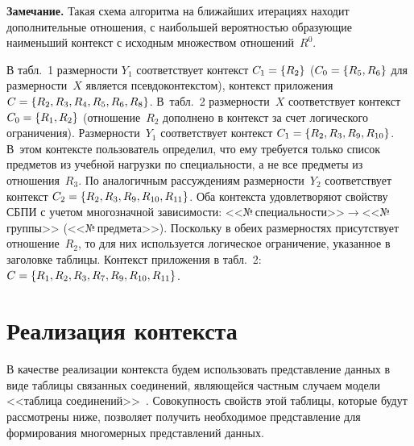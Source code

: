 \begin{multicols}{2}
  \noindent
  \textbf{Замечание.} Такая схема алгоритма на ближайших итерациях находит 
дополнительные отношения, с наибольшей вероятностью образующие 
наименьший контекст с исходным множеством отношений~$R^0$.
  
  \smallskip
  
  В табл.~1 размерности $Y_1$ соответствует контекст $C_1\hm=\{R_2\}$ 
($C_0\hm=\{R_5, R_6\}$ для размерности~$X$ является псевдоконтекстом), 
контекст приложения $C\hm=\{R_2, R_3, R_4, R_5, R_6, R_8\}$. В~табл.~2 
раз\-мер\-ности~$X$ соответствует контекст $C_0\hm=\{R_1, R_2\}$ 
(отношение~$R_2$ дополнено в контекст за счет логического ограничения). 
Размерности~$Y_1$ соответствует контекст $C_1\hm=\{R_2, R_3, R_9, R_{10}\}$. 
В~этом контексте пользователь определил, что ему требуется только список 
предметов из учебной нагрузки по специальности, а не все предметы из 
отношения~$R_3$. По аналогичным рассуждениям размерности~$Y_2$ 
соответствует контекст $C_2\hm=\{R_2, R_3, R_9, R_{10}, R_{11}\}$. Оба контекста 
удовлетворяют свойству СБПИ с учетом многозначной зависимости: 
<<№\,спе\-ци\-аль\-ности>>\;$\to$\;<<№\,груп\-пы>> (<<№\,предмета>>). 
Поскольку в обеих размерностях присутствует отношение~$R_2$, то для них 
используется логическое ограничение, указанное в заголовке таблицы. 
Контекст приложения в табл.~2: $C\hm= \{R_1, R_2, R_3, R_7, R_9, R_{10}, 
R_{11}\}$.

  
\section{Реализация контекста}

  
  В качестве реализации контекста будем использовать представление данных 
в виде таблицы связанных соединений, являющейся частным случаем модели 
<<таблица соединений>>~\cite{17-z}. Совокупность свойств этой таблицы, 
которые будут рассмотрены ниже, позволяет получить необходимое 
пред\-став\-ле\-ние для формирования многомерных пред\-став\-ле\-ний данных.

  \begin{table*}[b]\small
  \begin{center}
  \vspace*{2ex}
  

\end{center}
\end{table*}
\end{multicols}
